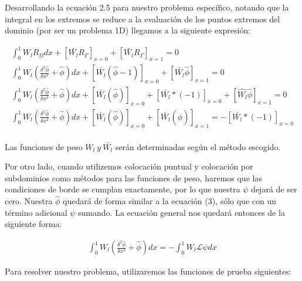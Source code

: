 \documentclass[11pt]{article}
\begin{document}
\bigskip Desarrollando la ecuaci\'on 2.5 para nuestro problema espec\'ifico, notando que la integral en los extremos se reduce a la evaluaci\'on de los puntos extremos del dominio (por ser un problema 1D) llegamos a la siguiente expresi\'on:

\begin{equation}
\begin{split}
\int_0^1 W_l R_\Omega dx + \left[\bar{W_l} R_\Gamma \right]_{x=0} + \left[\bar{W_l} R_\Gamma \right]_{x=1} = 0 \\ 
\int_0^1 W_l (\frac{\delta^2\hat{\phi}}{\delta x^2} + \hat{\phi}) dx + \left[\bar{W_l} (\hat{\phi}-1) \right]_{x=0} + \left[\bar{W_l} \hat{\phi} \right]_{x=1} = 0 \\ 
\int_0^1 W_l (\frac{\delta^2\hat{\phi}}{\delta x^2} + \hat{\phi}) dx + \left[\bar{W_l} (\hat{\phi}) \right]_{x=0} + \left[\bar{W_l} * (-1) \right]_{x=0} +  \left[\hat{W_l} \hat{\phi} \right]_{x=1} = 0 \\ 
\int_0^1 W_l (\frac{\delta^2\hat{\phi}}{\delta x^2} + \hat{\phi}) dx + \left[\bar{W_l} (\hat{\phi}) \right]_{x=0} +  \left[\bar{W_l} (\hat{\phi}) \right]_{x=1} = - \left[\bar{W_l} * (-1) \right]_{x=0} \\ 
\end{split}
\end{equation}

\bigskip Las funciones de peso $W_l \ y \ \bar{W_l}$ ser\'an determinadas seg\'un el m\'etodo escogido. 

\bigskip Por otro lado, cuando utilizemos colocaci\'on puntual y colocaci\'on por subdominios como m\'etodos para las funciones de peso, haremos que las condiciones de borde se cumplan exactamente, por lo que nuestra $\psi$ dejar\'a de ser cero. Nuestra $\hat{\phi}$ quedar\'a de forma similar a la ecuaci\'on (3), s\'olo que con un t\'ermino adicional $\psi$ sumando. La ecuaci\'on general nos quedar\'a entonces de la siguiente forma:

\begin{equation}
\begin{split}
\int_0^1 W_l (\frac{\delta^2\hat{\phi}}{\delta x^2} + \hat{\phi}) dx = - \int_0^1 W_l \mathcal{L}\psi dx 
\end{split}
\end{equation}

\bigskip Para resolver nuestro problema, utilizaremos las funciones de prueba siguientes:
\end{document}
